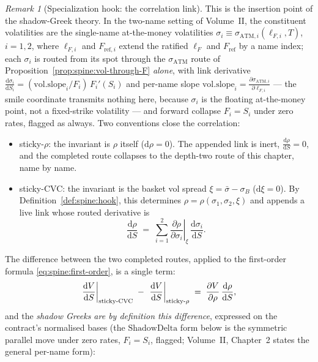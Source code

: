 \documentclass[11pt]{book}
\theoremstyle{plain}
\theoremstyle{definition}
\theoremstyle{remark}
\newtheorem{remark}[theorem]{Remark}
\newcommand{\lF}{\ell_F}                         %
\newcommand{\Fref}{F_{\mathrm{ref}}}             %
\newcommand{\satm}{\sigma_{\mathrm{ATM}}}        %
\newcommand{\satmi}[1]{\sigma_{\mathrm{ATM},#1}} %
\newcommand{\lFi}[1]{\ell_{F,#1}}                %
\newcommand{\Frefi}[1]{F_{\mathrm{ref},#1}}      %
\newcommand{\volslope}{\mathrm{vol.slope}}       %
\newcommand{\sB}{\sigma_B}                       %
\newcommand{\sbmean}{\bar\sigma}                 %
\newcommand{\shdelta}{\mathrm{ShadowDelta}}
\newcommand{\stickyrho}{\textnormal{sticky-}\ensuremath{\rho}} %
\newcommand{\stickycvc}{\textnormal{sticky-CVC}}               %
\newcommand{\SigmaM}{\Sigma_M}                   %
\newcommand{\dd}{\mathrm{d}}                                  %
\newcommand{\pd}[2]{\frac{\partial #1}{\partial #2}}          %
\newcommand{\td}[2]{\frac{\dd #1}{\dd #2}}                    %
\newcommand{\atfixed}[2]{\left.#1\right|_{#2}}                %
\begin{document}
\begin{remark}[Specialization hook: the correlation link]\label{rem:spine:hook}
This is the insertion point of the shadow-Greek theory. In the two-name
setting of Volume~II, the constituent volatilities are the single-name
at-the-money volatilities
$\sigma_i \equiv \satmi{i}(\lFi{i}, T)$, $i = 1, 2$, where $\lFi{i}$ and
$\Frefi{i}$ extend the ratified $\lF$ and $\Fref$ by a name index;
each $\sigma_i$ is routed from its spot through the $\satm$ route of
Proposition~\ref{prop:spine:vol-through-F} \emph{alone}, with link
derivative $\td{\sigma_i}{S_i} = (\volslope_i / F_i)\, F_i'(S_i)$ and
per-name slope $\volslope_i = \pd{\satmi{i}}{\lFi{i}}$ --- the smile
coordinate transmits nothing here, because $\sigma_i$ is the floating
at-the-money point, not a fixed-strike volatility --- and forward collapse
$F_i = S_i$ under zero rates, flagged as always. Two conventions close the
correlation:
\begin{itemize}
  \item \stickyrho{}: the invariant is $\rho$ itself ($\dd\rho = 0$). The
        appended link is inert, $\td{\rho}{S} = 0$, and the completed route
        collapses to the depth-two route of this chapter, name by name.
  \item \stickycvc{}: the invariant is the basket vol spread
        $\xi = \sbmean - \sB$ ($\dd\xi = 0$). By
        Definition~\ref{def:spine:hook}, this determines
        $\rho = \rho(\sigma_1, \sigma_2, \xi)$ and appends a live link whose
        routed derivative is
        \begin{equation}\label{eq:spine:hook-link}
          \td{\rho}{S}
          \;=\; \sum_{i=1}^{2}
            \atfixed{\pd{\rho}{\sigma_i}}{\xi}\, \td{\sigma_i}{S}.
        \end{equation}
\end{itemize}
The difference between the two completed routes, applied to the first-order
formula \eqref{eq:spine:first-order}, is a single term:
\begin{equation}\label{eq:spine:hook-difference}
  \atfixed{\td{V}{S}}{\stickycvc}
  \;-\;
  \atfixed{\td{V}{S}}{\stickyrho}
  \;=\; \pd{V}{\rho}\,\td{\rho}{S},
\end{equation}
and the \emph{shadow Greeks are by definition this difference}, expressed on
the contract's normalised bases (the $\shdelta$ form below is the symmetric
parallel move under zero rates, $F_i = S_i$, flagged; Volume~II, Chapter~2
states the general per-name form):
\begin{equation}\label{eq:spine:hook-shadow}

\end{equation}
\end{remark}
\end{document}
